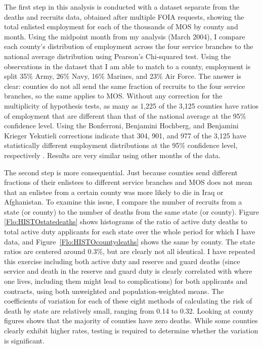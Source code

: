 \documentclass[12pt] {article}
\begin{document}
The first step in this analysis is conducted with a dataset separate from the deaths and recruits data, obtained after multiple FOIA requests, showing the total enlisted employment for each of the thousands of MOS by county and month. Using the midpoint month from my analysis (March 2004), I compare each county's distribution of employment across the four service branches to the national average distribution  using Pearson's Chi-squared test. Using the observations in the dataset that I am able to match to a county, employment is split 35\% Army, 26\% Navy, 16\% Marines, and 23\% Air Force. The answer is clear: counties do not all send the same fraction of recruits to the four service branches, so the same applies to MOS. Without any correction for the multiplicity of hypothesis tests, as many as 1,225 of the 3,125 counties have ratios of employment that are different than that of the national average at the 95\% confidence level. Using the Bonferroni, Benjamini Hochberg, and Benjamini Krieger Yekutieli corrections indicate that 304, 901, and 977 of the 3,125 have statistically different employment distributions at the 95\% confidence level, respectively \citep{BenHoch1995, BKY2006}. Results are very similar using other months of the data.

The second step is more consequential. Just because counties send different fractions of their enlistees to different service branches and MOS does not mean that an enlistee from a certain county was more likely to die in Iraq or Afghanistan. To examine this issue, I compare the number of recruits from a state (or county) to the number of deaths from the same state (or county). Figure \ref{Flo:HISTOstatedeaths} shows histograms of the ratio of active duty deaths to total active duty applicants for each state over the whole period for which I have data, and  Figure~\ref{Flo:HISTOcountydeaths} shows the same by county. The state ratios are centered around 0.3\%, but are clearly not all identical. I have repeated this exercise including both active duty and reserve and guard deaths (since service and death in the reserve and guard duty is clearly correlated with where one lives, including them might lead to complications) for both applicants and contracts, using both unweighted and population-weighted means. The coefficients of variation for each
of these eight methods of calculating the risk of death by state are
relatively small, ranging from 0.14 to 0.32. Looking at county figures shows that the majority of counties have zero deaths. While some counties clearly exhibit higher rates, testing is required to determine whether the variation is significant. 
\end{document}
